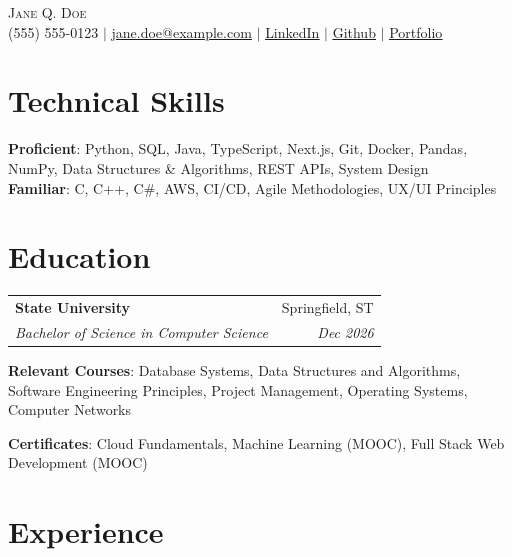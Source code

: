 \documentclass[letterpaper,11pt]{article}
\makeatletter
\newcommand{\resumeSubheading}[4]{
  \vspace{-2pt}
    \begin{tabular*}{0.97\textwidth}[t]{l@{\extracolsep{\fill}}r}
      \textcolor{myblue}{\textbf{#1}} & \textcolor{myblue}{#2} \\
      \textit{\small#3} & \textit{\small #4} \\
    \end{tabular*}\vspace{-7pt}
}
\newcommand{\resumeSubHeadingListStart}{\begin{itemize}[leftmargin=0.15in, label={}]}
\newcommand{\resumeSubHeadingListEnd}{\end{itemize}}
\makeatother
\begin{document}
\begin{center}
    {\Huge \scshape \textcolor{myblue}{Jane Q. Doe}} \\ \vspace{1pt}
    \small (555) 555-0123 $|$ \href{mailto:jane.doe@example.edu}{\underline{jane.doe@example.com}} $|$ 
    \href{https://www.example.com/in/jane-doe/}{\underline{LinkedIn}} $|$
    \href{https://example.com/janedoe}{\underline{Github}} $|$
    \href{https://janedoe.example.com/}{\underline{Portfolio}}
\end{center}


\section{Technical Skills}
\begin{itemize}[leftmargin=0.15in, label={}]
  \small{\item{
    \textbf{Proficient}{: Python, SQL, Java, TypeScript, Next.js, Git, Docker, Pandas, NumPy, Data Structures \& Algorithms, REST APIs, System Design} \\
    \textbf{Familiar}{: C, C++, C\#, AWS, CI/CD,  Agile Methodologies, UX/UI Principles}
  }}
\end{itemize}

\section{Education}
  \resumeSubHeadingListStart
    \item \resumeSubheading %
      {State University}{Springfield, ST}
      {Bachelor of Science in Computer Science}{Dec 2026}
      \begin{itemize}[leftmargin=0.15in, label={}]
        \small{\item{
          \textbf{Relevant Courses}{: Database Systems, Data Structures and Algorithms, Software Engineering Principles, Project Management, Operating Systems, Computer Networks}
        }}
      \end{itemize}
      \small{\item{
        \textbf{Certificates}{: Cloud Fundamentals, Machine Learning (MOOC), Full Stack Web Development (MOOC)}
      }}
  \resumeSubHeadingListEnd


\section{Experience}
 
\end{document}
